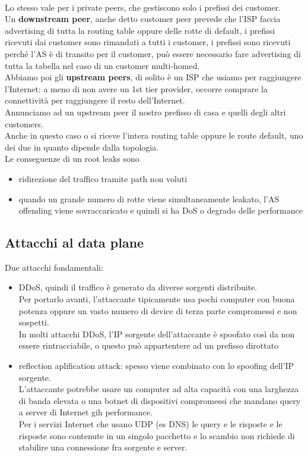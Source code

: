 \documentclass[12pt, oneside]{extbook} %
\begin{document}
\\Lo stesso vale per i private peers, che gestiscono solo i prefissi dei customer.
\\Un \textbf{downstream peer}, anche detto customer peer prevede che l'ISP faccia advertising di tutta la routing table oppure delle rotte di default, i prefissi ricevuti dai customer sono rimandati a tutti i customer, i prefissi sono ricevuti perché l'AS è di transito per il customer, può essere necessario fare advertising di tutta la tabella nel caso di un customer multi-homed.
\\Abbiamo poi gli \textbf{upstream peers}, di solito è un ISP che usiamo per raggiungere l'Internet: a meno di non avere un 1st tier provider, occorre comprare la connettività per raggiungere il resto dell'Internet.
\\Annunciamo ad un upstream peer il nostro prefisso di casa e quelli degli altri customers.
\\Anche in questo caso o si riceve l'intera routing table oppure le route default, uno dei due in quanto dipende dalla topologia.
\\Le conseguenze di un root leaks sono
\begin{itemize}
    \item ridirezione del traffico tramite path non voluti
    \item quando un grande numero di rotte viene simultaneamente leakato, l'AS offending viene sovraccaricato e quindi si ha DoS o degrado delle performance
\end{itemize}

\subsection{Attacchi al data plane}
Due attacchi fondamentali:
\begin{itemize}
    \item DDoS, quindi il traffico è generato da diverse sorgenti distribuite.
    \\Per portarlo avanti, l'attaccante tipicamente usa pochi computer con buona potenza oppure un vasto numero di device di terza parte compromessi e non sospetti.
    \\In molti attacchi DDoS, l'IP sorgente dell'attaccante è spoofato così da non essere rintracciabile, o questo può appartentere ad un prefisso dirottato
    \item reflection aplification attack: spesso viene combinato con lo spoofing dell'IP sorgente.
    \\L'attaccante potrebbe usare un computer ad alta capacità con una larghezza di banda elevata o una botnet di dispositivi compromessi che mandano query a server di Internet gih performance.
        \\Per i servizi Internet che usano UDP (es DNS) le query e le risposte e le risposte sono contenute in un singolo pacchetto e lo scambio non richiede di stabilire una connessione fra sorgente e server.
\end{itemize}
\end{document}
